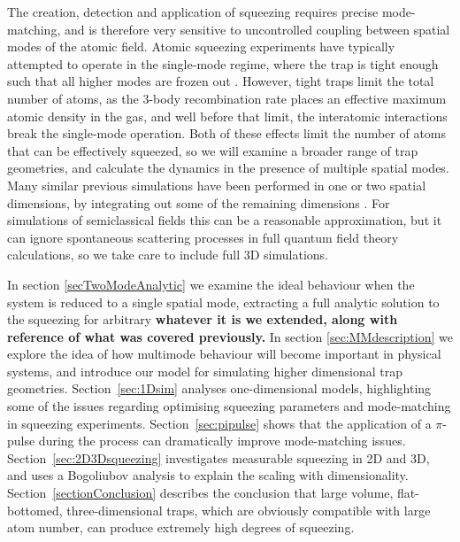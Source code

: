 \documentclass{iopart}
\begin{document}
The creation, detection and application of squeezing requires precise mode-matching, and is therefore very sensitive to uncontrolled coupling between spatial modes of the atomic field.  Atomic squeezing experiments have typically attempted to operate in the single-mode regime, where the trap is tight enough such that all higher modes are frozen out \cite{LiET2009}.  However, tight traps limit the total number of atoms, as the 3-body recombination rate places an effective maximum atomic density in the gas, and well before that limit, the interatomic interactions break the single-mode operation.  Both of these effects limit the number of atoms that can be effectively squeezed, so we will examine a broader range of trap geometries, and calculate the dynamics in the presence of multiple spatial modes.
Many similar previous simulations have been performed in one or two spatial dimensions, by integrating out some of the remaining dimensions \cite{kheruntsyanET2002, kheruntsyanET2005, johnssonET2007, haineET2009}.  For simulations of semiclassical fields this can be a reasonable approximation, but it can ignore spontaneous scattering processes in full quantum field theory calculations, so we take care to include full 3D simulations. 

In section \ref{secTwoModeAnalytic} we examine the ideal behaviour when the system is reduced to a single spatial mode, extracting a full analytic solution to the squeezing for arbitrary \textbf{whatever it is we extended, along with reference of what was covered previously.}  In section \ref{sec:MMdescription} we explore the idea of how multimode behaviour will become important in physical systems, and introduce our model for simulating higher dimensional trap geometries.  Section~\ref{sec:1Dsim} analyses one-dimensional models, highlighting some of the issues regarding optimising squeezing parameters and mode-matching in squeezing experiments.  Section~\ref{sec:pipulse} shows that the application of a $\pi$-pulse during the process can dramatically improve mode-matching issues.  Section~\ref{sec:2D3Dsqueezing} investigates measurable squeezing in 2D and 3D, and uses a Bogoliubov analysis to explain the  scaling with dimensionality.  Section~\ref{sectionConclusion} describes the conclusion that large volume, flat-bottomed, three-dimensional traps, which are obviously compatible with large atom number, can produce extremely high degrees of squeezing.
\end{document}
